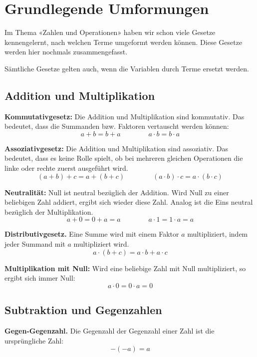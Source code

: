 \newpage
\section{Grundlegende Umformungen}

Im Thema «Zahlen und Operationen» haben wir schon viele Gesetze kennengelernt, nach welchen Terme umgeformt werden können. Diese Gesetze werden hier nochmals zusammengefasst.

Sämtliche Gesetze gelten auch, wenn die Variablen durch Terme ersetzt werden.

\subsection{Addition und Multiplikation}

\textbf{Kommutativgesetz:} Die Addition und Multiplikation sind kommutativ. Das bedeutet, dass die Summanden bzw. Faktoren vertauscht werden können:
\[
  a+b = b+a \qquad\qquad a\cdot b = b\cdot a
\]

\textbf{Assoziativgesetz:} Die Addition und Multiplikation sind assoziativ. Das bedeutet, dass es keine Rolle spielt, ob bei mehreren gleichen Operationen die linke oder rechte zuerst ausgeführt wird.
\[
  (a + b) + c = a + (b + c) \qquad\qquad (a\cdot b)\cdot c = a\cdot(b\cdot c)
\]


\textbf{Neutralität:} Null ist neutral bezüglich der Addition. Wird Null zu einer beliebigen Zahl addiert, ergibt sich wieder diese Zahl. Analog ist die Eins neutral bezüglich der Multiplikation.
\[
  a + 0 = 0 + a = a \qquad\qquad a\cdot 1 = 1\cdot a = a
\]

\textbf{Distributivgesetz.} Eine Summe wird mit einem Faktor $a$ multipliziert, indem jeder Summand mit $a$ multipliziert wird.
\[
  a \cdot (b + c) = a \cdot b + a \cdot c
\]

\textbf{Multiplikation mit Null:} Wird eine beliebige Zahl mit Null multipliziert, so ergibt sich immer Null:
\[
  a\cdot 0 = 0\cdot a = 0
\]

\subsection{Subtraktion und Gegenzahlen}

\textbf{Gegen-Gegenzahl.} Die Gegenzahl der Gegenzahl einer Zahl ist die ursprüngliche Zahl:
\[
  -(-a) = a
\]

